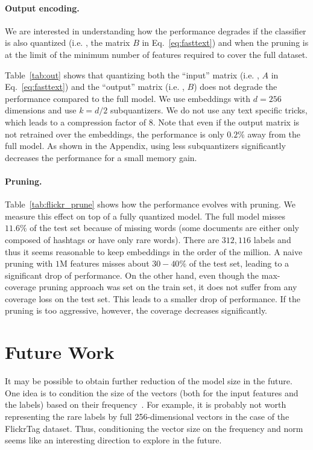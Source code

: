 \paragraph{Output encoding.} We are interested in understanding how the performance degrades if  the classifier is also quantized (i.e. , the matrix $B$ in Eq.~\ref{eq:fasttext}) and when the pruning is at the limit of the minimum number of features required to cover the full dataset. 

Table~\ref{tab:out} shows that quantizing both the ``input'' matrix (i.e. , $A$ in Eq.~\ref{eq:fasttext}) and the ``output'' matrix  (i.e. , $B$) does not degrade the performance compared to the full model. We use embeddings with $d=256$ dimensions and use $k=d/2$ subquantizers. We do not use any text specific tricks, which leads to a compression factor of $8$. Note that even if the output matrix is not retrained over the embeddings, the performance is only
$0.2\%$ away from the full model.  As shown in the Appendix, using less subquantizers significantly decreases the performance for a small memory gain.

\paragraph{Pruning.}
Table~\ref{tab:flickr_prune} shows how the performance evolves with pruning.  We measure this effect on top of a fully quantized model.  The full model misses
$11.6\%$ of the test set because of missing words (some documents are either only composed of hashtags or have only rare words).  There are $312,116$ labels and thus it seems reasonable to keep embeddings in the order of the million.  A naive pruning with $1$M features misses about $30-40\%$ of the test set, leading to a significant drop of performance. On the other hand, even though the max-coverage pruning approach was set on the train set, it does not suffer from any coverage loss on the test set. This leads to a smaller drop of performance. If the pruning is too aggressive, however, the coverage decreases significantly.

\section{Future Work}

It may be possible to obtain further reduction of the model size in the future. One idea is to condition the size of the vectors (both for the input features and the labels) based on their frequency~\citep{chen2015strategies,grave2016efficient}. For example, it is probably not worth representing the rare labels by full 256-dimensional vectors in the case of the FlickrTag dataset. Thus, conditioning the vector size on the frequency and norm seems like an interesting direction to explore in the future.

